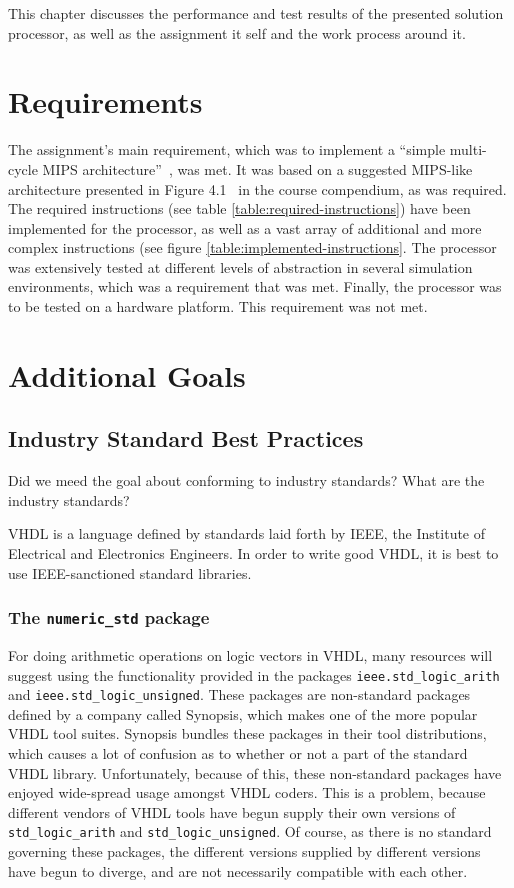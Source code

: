This chapter discusses the performance and test results of the presented solution processor, as well as the assignment it self and the work process around it.

\section{Requirements}

The assignment's main requirement, which was to implement a ``simple multi-cycle MIPS architecture''~\cite[p.114]{compendium}, was met.
It was based on a suggested MIPS-like architecture presented in Figure 4.1~\cite[p.115]{compendium} in the course compendium, as was required.
The required instructions (see table \vref{table:required-instructions}) have been implemented for the processor, as well as a vast array of additional and more complex instructions (see figure \vref{table:implemented-instructions}.
The processor was extensively tested at different levels of abstraction in several simulation environments, which was a requirement that was met.
Finally, the processor was to be tested on a hardware platform.
This requirement was not met.

\section{Additional Goals}

\subsection{Industry Standard Best Practices}

Did we meed the goal about conforming to industry standards?
What are the industry standards?

VHDL is a language defined by standards laid forth by IEEE, the Institute of Electrical and Electronics Engineers.
In order to write good VHDL, it is best to use IEEE-sanctioned standard libraries.

\subsubsection{The \texttt{numeric\_std} package~\cite{why-library-numericstd-is-preferred}} \label{sec:numeric-std}

For doing arithmetic operations on logic vectors in VHDL, many resources will suggest using the functionality provided in the packages \texttt{ieee.std\_logic\_arith} and \texttt{ieee.std\_logic\_unsigned}.
These packages are non-standard packages defined by a company called Synopsis, which makes one of the more popular VHDL tool suites.
Synopsis bundles these packages in their tool distributions, which causes a lot of confusion as to whether or not a part of the standard VHDL library.
Unfortunately, because of this, these non-standard packages have enjoyed wide-spread usage amongst VHDL coders.
This is a problem, because different vendors of VHDL tools have begun supply their own versions of \texttt{std\_logic\_arith} and \texttt{std\_logic\_unsigned}.
Of course, as there is no standard governing these packages, the different versions supplied by different versions have begun to diverge, and are not necessarily compatible with each other.

